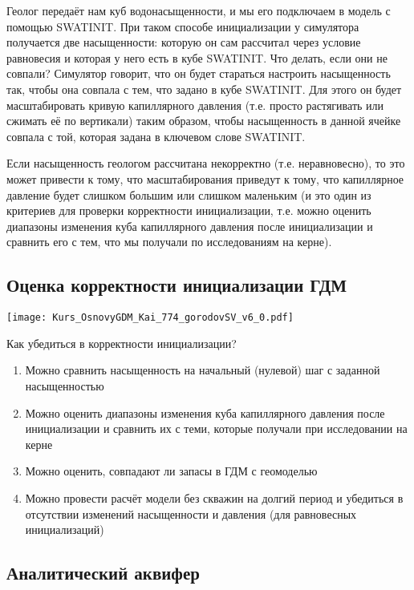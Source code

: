 \documentclass[main.tex]{subfiles}
\begin{document}
Геолог передаёт нам куб водонасыщенности, и мы его подключаем в модель с помощью SWATINIT.
При таком способе инициализации у симулятора получается две насыщенности: которую он сам рассчитал через условие равновесия и которая у него есть в кубе SWATINIT.
Что делать, если они не совпали?
Симулятор говорит, что он будет стараться настроить насыщенность так, чтобы она совпала с тем, что задано в кубе SWATINIT.
Для этого он будет масштабировать кривую капиллярного давления (т.е. просто растягивать или сжимать её по вертикали) таким образом, чтобы насыщенность в данной ячейке совпала с той, которая задана в ключевом слове SWATINIT.

Если насыщенность геологом рассчитана некорректно (т.е. неравновесно), то это может привести к тому, что масштабирования приведут к тому, что капиллярное давление будет слишком большим или слишком маленьким (и это один из критериев для проверки корректности инициализации, т.е. можно оценить диапазоны изменения куба капиллярного давления после инициализации и сравнить его с тем, что мы получали по исследованиям на керне).

\subsection{Оценка корректности инициализации ГДМ}

\texttt{[image: Kurs\_OsnovyGDM\_Kai\_774\_gorodovSV\_v6\_0.pdf]}

Как убедиться в корректности инициализации?

\begin{enumerate}
	\item Можно сравнить насыщенность на начальный (нулевой) шаг с заданной насыщенностью
	\item Можно оценить диапазоны изменения куба капиллярного давления после инициализации и сравнить их с теми, которые получали при исследовании на керне
	\item Можно оценить, совпадают ли запасы в ГДМ с геомоделью
	\item Можно провести расчёт модели без скважин на долгий период и убедиться в отсутствии изменений насыщенности и давления (для равновесных инициализаций)
\end{enumerate}

\subsection{Аналитический аквифер}
\end{document}
